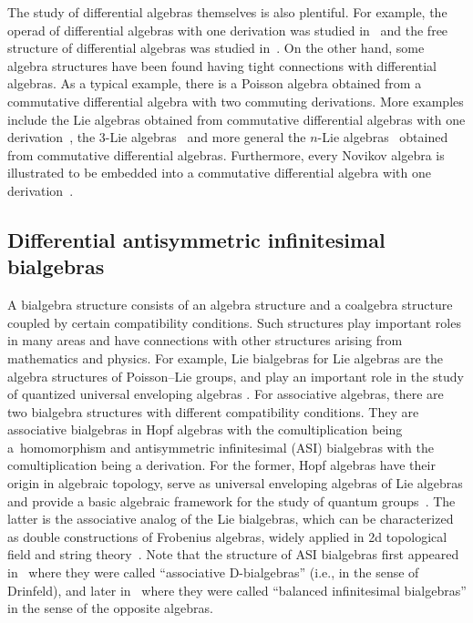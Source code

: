 \documentclass[pdftex]{sigma}
\numberwithin{equation}{section}
\begin{document}
The study of differential algebras themselves is also plentiful. For example, the
operad of differential algebras with one derivation was studied in~\cite{loday2010operad} and the free structure of differential
algebras was studied in~\cite{guo2008differential}.
On the other hand, some algebra structures have been found having tight connections with differential algebras.
As a typical example, there is a Poisson algebra obtained from a commutative differential algebra with two commuting derivations.
More examples include the Lie algebras obtained from commutative differential algebras with one derivation~\cite{Xu}, the 3-Lie algebras~\cite{nambu1995generalized} and more general the $n$-Lie algebras~\cite{filippov1985n} obtained from commutative differential algebras.
Furthermore, every Novikov algebra is illustrated to be embedded into a commutative differential algebra with one derivation~\cite{bokut2017grobner}.

\subsection{Differential antisymmetric infinitesimal bialgebras}\label{Sec:1.2}

A bialgebra structure consists of an algebra structure and a coalgebra structure coupled by certain compatibility conditions.
Such structures play important roles in many areas and have connections with other structures arising from mathematics and physics.
For example, Lie bialgebras for Lie algebras are the algebra structures of Poisson--Lie groups, and play an important role in the study of quantized universal enveloping algebras \cite{chari1995guide,drinfegammad1983hamiltonian}.
For associative algebras, there are two bialgebra structures with different compatibility conditions.
They are associative bialgebras in Hopf algebras with the comultiplication being a~homomorphism and antisymmetric infinitesimal (ASI) bialgebras with the comultiplication being a derivation.
For the former, Hopf algebras have their origin in algebraic topology, serve as universal enveloping algebras of Lie algebras and provide a basic algebraic framework for the study of quantum groups~\cite{abe2004hopf}.
The latter is the associative analog of the Lie bialgebras, which can be characterized as double constructions of Frobenius algebras, widely applied in 2d topological field and string theory~\cite{AguiarOn, BaiDouble, joni1979coalgebras, kockfrobenius, lauda2008open}.
Note that the structure of ASI bialgebras first appeared in~\cite{zhelyabian1997jordan} where they were called ``associative D-bialgebras'' (i.e., in the sense of Drinfeld), and later in~\cite{AguiarOn} where they were called ``balanced infinitesimal bialgebras'' in the sense of the opposite algebras.
\end{document}
